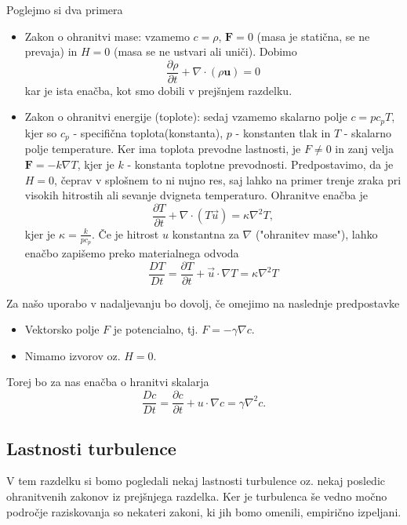 \documentclass[mat2, tisk]{fmfdelo}
\newcommand{\bd}{\textbf}
\begin{document}
Poglejmo si dva primera
\begin{primer}
  \hfil
\begin{itemize}
  \item Zakon o ohranitvi mase: vzamemo $c = \rho$, $\bd{F} = 0$ (masa je statična, se ne prevaja) in 
  $H = 0$ (masa se ne ustvari ali uniči). Dobimo
  $$
  \frac{\partial \rho}{\partial t} + \nabla \cdot (\rho \bd{u}) = 0
  $$
  kar je ista enačba, kot smo dobili v prejšnjem razdelku.
  \item Zakon o ohranitvi energije (toplote): sedaj vzamemo skalarno polje $c = pc_p T$, kjer 
  so $c_p$ - specifična toplota(konstanta), $p$ - konstanten tlak in $T$ - skalarno polje temperature. 
  Ker ima toplota prevodne lastnosti, je $F \neq 0$ in zanj velja $\bd{F} = -k\nabla T$, kjer je 
  $k$ - konstanta toplotne prevodnosti. Predpostavimo, da je $H = 0$, čeprav v splošnem to 
  ni nujno res, saj lahko na primer trenje zraka pri visokih hitrostih ali sevanje 
  dvigneta temperaturo. Ohranitve enačba je 
  \begin{equation}
  \frac{\partial T}{\partial t} + \nabla \cdot (T \vec{u}) = \kappa \nabla^2 T,
  \end{equation}
  kjer je $\kappa = \frac{k}{p c_p}$.
  Če je hitrost $u$ konstantna za $\nabla$ ("ohranitev mase"), lahko enačbo zapišemo preko materialnega odvoda
  \begin{equation}
  \frac{D T}{D t} = \frac{\partial T}{\partial t} + \vec{u}\cdot\nabla T = \kappa \nabla^2 T
  \end{equation}
\end{itemize}
\end{primer}
Za našo uporabo v nadaljevanju bo dovolj, če omejimo na naslednje predpostavke
\begin{itemize}
  \item Vektorsko polje $F$ je potencialno, tj. $F = - \gamma \nabla c$. 
  \item Nimamo izvorov oz. $H = 0$.
\end{itemize}
Torej bo za nas enačba o hranitvi skalarja 
\begin{equation}
\frac{D c}{D t} = \frac{\partial c}{\partial t} + u\cdot\nabla c = \gamma \nabla^2 c.
\end{equation}

\subsection{Lastnosti turbulence}
V tem razdelku si bomo pogledali nekaj lastnosti turbulence oz. nekaj posledic 
ohranitvenih zakonov iz prejšnjega razdelka. Ker je turbulenca še vedno močno 
področje raziskovanja so nekateri zakoni, ki jih bomo omenili, empirično izpeljani.
\end{document}
